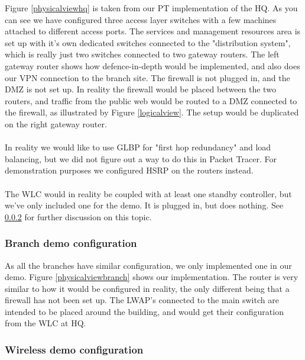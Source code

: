 Figure \ref{physicalviewhq} is taken from our PT implementation of the HQ. As you can see we have configured three access layer switches with a few machines attached to different access ports. The services and management resources area is set up with it's own dedicated switches connected to the "distribution system", which is really just two switches connected to two gateway routers. The left gateway router shows how defence-in-depth would be implemented, and also does our VPN connection to the branch site. The firewall is not plugged in, and the DMZ is not set up. In reality the firewall would be placed between the two routers, and traffic from the public web would be routed to a DMZ connected to the firewall, as illustrated by Figure \ref{logicalview}. The setup would be duplicated on the right gateway router.
\\
\\
In reality we would like to use GLBP for "first hop redundancy" and load balancing, but we did not figure out a way to do this in Packet Tracer. For demonstration purposes we configured HSRP on the routers instead.
\\
\\
The WLC would in reality be coupled with at least one standby controller, but we've only included one for the demo. It is plugged in, but does nothing. See \ref{demowireless} for further discussion on this topic.


\subsubsection{Branch demo configuration}

As all the branches have similar configuration, we only implemented one in our demo. Figure \ref{physicalviewbranch} shows our implementation. %
The router is very similar to how it would be configured in reality, the only different being that a firewall has not been set up. The LWAP's connected to the main switch are intended to be placed around the building, and would get their configuration from the WLC at HQ.

\subsubsection{Wireless demo configuration} \label{demowireless}

